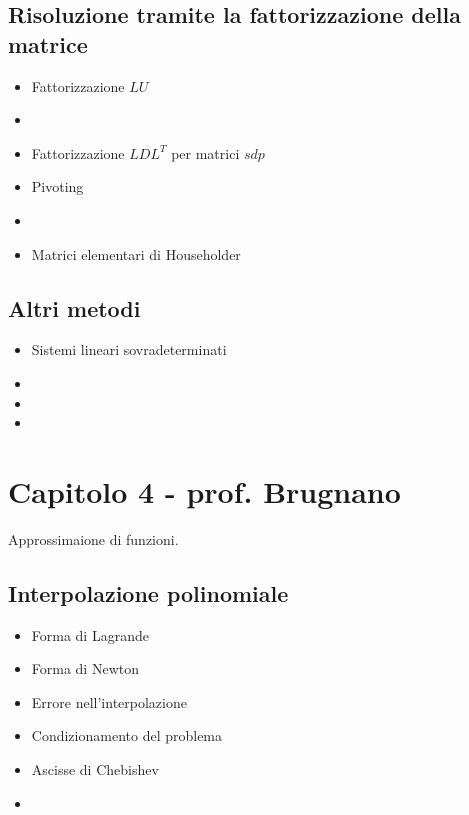 \documentclass[a4paper, 12pt]{article}
\begin{document}
\subsection{Risoluzione tramite la fattorizzazione della matrice}
	\begin{itemize}
		\item Fattorizzazione $LU$
		\subitem \color{blue}{costo computazionale} \color{black}
		\item \color{blue}{Matrici a diagonale dominante} \color{black}
		\item Fattorizzazione $LDL^T$ per matrici $sdp$
		\item Pivoting
		\item \color{blue}{Studio del condizionamento} \color{black}
		\item Matrici elementari di Householder
		\subitem \color{blue}{fattorizzazione $QR$} \color{black}
	\end{itemize}

\subsection{Altri metodi}
	\begin{itemize}
		\item Sistemi lineari sovradeterminati
		\item \color{blue}{Metodo di Jacobi} \color{black}
		\item \color{blue}{Metodo di Gauss-Seidel} \color{black}
		\item \color{blue}{Splitting regolari di matrici} \color{black}
	\end{itemize}

\vspace{0.5cm}

\section{Capitolo 4 - prof. Brugnano}

Approssimaione di funzioni.

\subsection{Interpolazione polinomiale}
	\begin{itemize}
		\item Forma di Lagrande
		\item Forma di Newton
		\item Errore nell'interpolazione
		\item Condizionamento del problema
		\item Ascisse di Chebishev
		\item \color{green}{Polinomio interpolante di Hermite} \color{black}
	\end{itemize}
\end{document}
